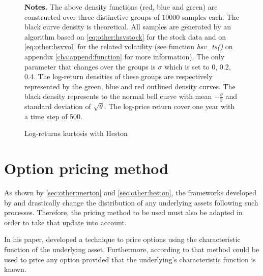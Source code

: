 \documentclass[12pt,a4paper]{report}
\begin{document}
\begin{figure}[ht]
\centering

\caption{Log-returns kurtosis with Heston}
  \begin{changemargin}{0.5cm}{0.5cm}
  \medskip
\footnotesize
{}\textbf{Notes.} The above density functions (red, blue and green) are constructed over three distinctive groups of 10000 samples each. The black curve density is theoretical.
All samples are generated by an algorithm based on \cref{eq:other:hsvstock} for the stock data and on \cref{eq:other:hsvvol} for the related volatility (see function \textit{hsv\_ts()} on appendix \ref{cha:append:function} for more information). 
The only parameter that changes over the groups is $\sigma$ which is set to 0, 0.2, 0.4. The log-return densities of these groups are respectively represented by the green, blue and red outlined density curves. 
The black density represents to the normal bell curve with mean $- \frac{\theta}{2}$ and standard deviation of $\sqrt{\theta}$. The log-price return cover one year with a time step of 500.    
\end{changemargin}
\label{p:other:heston:kurtosis}
\end{figure}




\section{Option pricing method}
\label{sec:other:option}

As shown by \cref{sec:other:merton} and \cref{sec:other:heston}, the frameworks developed by \citet{merton76} and \citet{heston1993} drastically change the distribution of any underlying assets following such processes. Therefore, the pricing method to be used must also be adapted in order to take that update into account.

In his paper, \citet{heston1993} developed a technique to price options using the characteristic function of the underlying asset. Furthermore, according to \citet{criso2015} that method could be used to price any option provided that the underlying's characteristic function is known.


\end{document}
